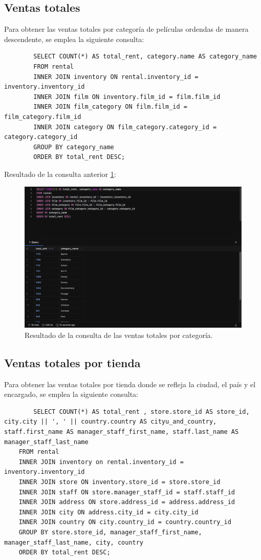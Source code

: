 \documentclass{report}
\begin{document}
	\subsection{Ventas totales}
	Para obtener las ventas totales por categoría de películas ordendas de manera descendente, se emplea la siguiente consulta:

	\begin{verbatim}
		SELECT COUNT(*) AS total_rent, category.name AS category_name
		FROM rental
		INNER JOIN inventory ON rental.inventory_id = inventory.inventory_id
		INNER JOIN film ON inventory.film_id = film.film_id
		INNER JOIN film_category ON film.film_id = film_category.film_id
		INNER JOIN category ON film_category.category_id = category.category_id
		GROUP BY category_name
		ORDER BY total_rent DESC;
	\end{verbatim}

	Resultado de la consulta anterior \ref{fig:Exercice-2-1}:

	\begin{figure}[H]
		\centering
		\includegraphics[scale=0.5]{img/Exercice-2.2.1-Comprobation.png}
		\caption{Resultado de la consulta de las ventas totales por categoría.}
		\label{fig:Exercice-2-1}
	\end{figure}

	\subsection{Ventas totales por tienda}
	Para obtener las ventas totales por tienda donde se refleja la ciudad, el país y el encargado,  se emplea la siguiente consulta:

	\begin{verbatim}
		SELECT COUNT(*) AS total_rent , store.store_id AS store_id, city.city || ', ' || country.country AS cityu_and_country, staff.first_name AS manager_staff_first_name, staff.last_name AS manager_staff_last_name
	FROM rental
	INNER JOIN inventory on rental.inventory_id = inventory.inventory_id
	INNER JOIN store ON inventory.store_id = store.store_id
	INNER JOIN staff ON store.manager_staff_id = staff.staff_id
	INNER JOIN address ON store.address_id = address.address_id
	INNER JOIN city ON address.city_id = city.city_id
	INNER JOIN country ON city.country_id = country.country_id
	GROUP BY store.store_id, manager_staff_first_name, manager_staff_last_name, city, country
	ORDER BY total_rent DESC;
	\end{verbatim}
\end{document}
